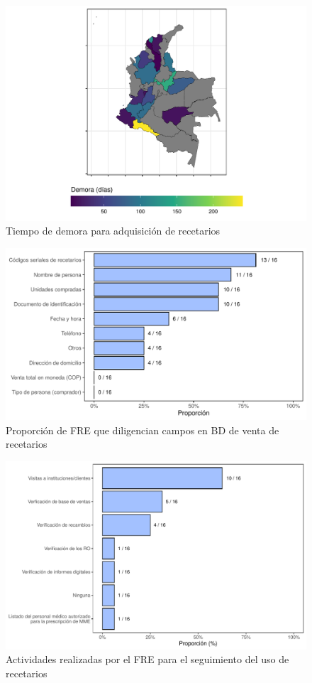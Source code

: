 \documentclass[
]{book}
\begin{document}
\begin{figure}
\includegraphics[width=0.85\linewidth]{InformeFinal_files/figure-latex/tiempoDemoraAdquisicion-1} \caption{Tiempo de demora para adquisición de recetarios}\label{fig:tiempoDemoraAdquisicion}
\end{figure}

\begin{figure}
\includegraphics[width=0.85\linewidth]{InformeFinal_files/figure-latex/BD-diligBDRecet-1} \caption{Proporción de FRE que diligencian campos en BD de venta de recetarios}\label{fig:BD-diligBDRecet}
\end{figure}

\begin{figure}
\includegraphics[width=0.85\linewidth]{InformeFinal_files/figure-latex/SeguimientoUsoRecetarios-1} \caption{Actividades realizadas por el FRE para el seguimiento del uso de recetarios}\label{fig:SeguimientoUsoRecetarios}
\end{figure}
\end{document}
